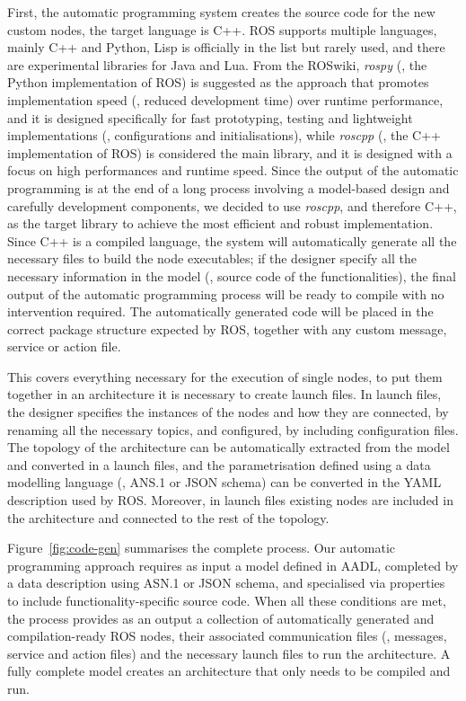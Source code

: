 First, the automatic programming system creates the source code for the new custom nodes, the target language is C++. ROS supports multiple languages, mainly C++ and Python, Lisp is officially in the list but rarely used, and there are experimental libraries for Java and Lua. From the ROSwiki, \textit{rospy} (\ie, the Python implementation of ROS) is suggested as the approach that promotes implementation speed (\ie, reduced development time) over runtime performance, and it is designed specifically for fast prototyping, testing and lightweight implementations (\eg, configurations and initialisations), while \textit{roscpp} (\ie, the C++ implementation of ROS) is considered the main library, and it is designed with a focus on high performances and runtime speed. Since the output of the automatic programming is at the end of a long process involving a model-based design and carefully development components, we decided to use \textit{roscpp}, and therefore C++, as the target library to achieve the most efficient and robust implementation. Since C++ is a compiled language, the system will automatically generate all the necessary files to build the node executables; if the designer specify all the necessary information in the model (\ie, source code of the functionalities), the final output of the automatic programming process will be ready to compile with no intervention required. The automatically generated code will be placed in the correct package structure expected by ROS, together with any custom message, service or action file.

This covers everything necessary for the execution of single nodes, to put them together in an architecture it is necessary to create launch files. In launch files, the designer specifies the instances of the nodes and how they are connected, by renaming all the necessary topics, and configured, by including configuration files. The topology of the architecture can be automatically extracted from the model and converted in a launch files, and the parametrisation defined using a data modelling language (\ie, ANS.1 or JSON schema) can be converted in the YAML description used by ROS. Moreover, in launch files existing nodes are included in the architecture and connected to the rest of the topology.

Figure~\ref{fig:code-gen} summarises the complete process. Our automatic programming approach requires as input a model defined in AADL, completed by a data description using ASN.1 or JSON schema, and specialised via properties to include functionality-specific source code. When all these conditions are met, the process provides as an output a collection of automatically generated and compilation-ready ROS nodes, their associated communication files (\ie, messages, service and action files) and the necessary launch files to run the architecture. A fully complete model creates an architecture that only needs to be compiled and run.

